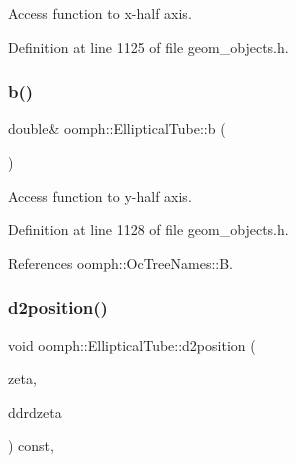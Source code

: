Access function to x-\/half axis. 



Definition at line 1125 of file geom\+\_\+objects.\+h.

\mbox{\label{classoomph_1_1EllipticalTube_a5ca528bf85b8c5f2f6b665046e8a613c}} 
\subsubsection{\texorpdfstring{b()}{b()}}
{\footnotesize\ttfamily double\& oomph\+::\+Elliptical\+Tube\+::b (\begin{DoxyParamCaption}{ }\end{DoxyParamCaption})\hspace{0.3cm}{\ttfamily [inline]}}



Access function to y-\/half axis. 



Definition at line 1128 of file geom\+\_\+objects.\+h.



References oomph\+::\+Oc\+Tree\+Names\+::B.

\mbox{\label{classoomph_1_1EllipticalTube_a8b64fd523511735679b5820c5fb687cf}} 
\subsubsection{\texorpdfstring{d2position()}{d2position()}\hspace{0.1cm}{\footnotesize\ttfamily [1/2]}}
{\footnotesize\ttfamily void oomph\+::\+Elliptical\+Tube\+::d2position (\begin{DoxyParamCaption}\item[{const \hyperlink{classoomph_1_1Vector}{Vector}$<$ double $>$ \&}]{zeta,  }\item[{\hyperlink{classoomph_1_1RankThreeTensor}{Rank\+Three\+Tensor}$<$ double $>$ \&}]{ddrdzeta }\end{DoxyParamCaption}) const\hspace{0.3cm}{\ttfamily [inline]}, {\ttfamily [virtual]}}



